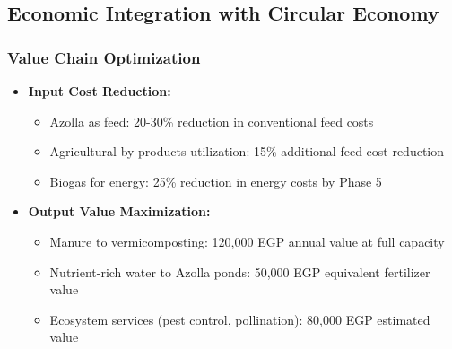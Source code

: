 \subsection{Economic Integration with Circular Economy}

\subsubsection{Value Chain Optimization}
\begin{itemize}
    \item \textbf{Input Cost Reduction:}
    \begin{itemize}
        \item Azolla as feed: 20-30\% reduction in conventional feed costs
        \item Agricultural by-products utilization: 15\% additional feed cost reduction
        \item Biogas for energy: 25\% reduction in energy costs by Phase 5
    \end{itemize}
    
    \item \textbf{Output Value Maximization:}
    \begin{itemize}
        \item Manure to vermicomposting: 120,000 EGP annual value at full capacity
        \item Nutrient-rich water to Azolla ponds: 50,000 EGP equivalent fertilizer value
        \item Ecosystem services (pest control, pollination): 80,000 EGP estimated value
    \end{itemize}
\end{itemize}

